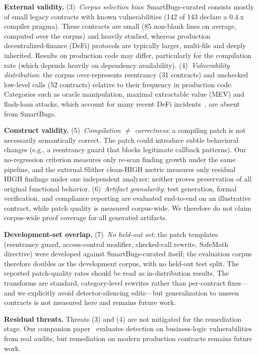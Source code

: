 \documentclass[conference]{IEEEtran}
\begin{document}
\textbf{External validity.} (3)~\emph{Corpus selection bias}: SmartBugs-curated consists mostly of small legacy contracts with known vulnerabilities (142 of 143 declare a 0.4.x compiler pragma). These contracts are small (85 non-blank lines on average, computed over the corpus) and heavily studied, whereas production decentralized-finance (DeFi) protocols are typically larger, multi-file and deeply inherited. Results on production code may differ, particularly for the compilation rate (which depends heavily on dependency availability). (4)~\emph{Vulnerability distribution}: the corpus over-represents reentrancy (31 contracts) and unchecked low-level calls (52 contracts) relative to their frequency in production code. Categories such as oracle manipulation, maximal extractable value (MEV) and flash-loan attacks, which account for many recent DeFi incidents~\cite{zhou2023sok}, are absent from SmartBugs.

\textbf{Construct validity.} (5)~\emph{Compilation $\neq$ correctness}: a compiling patch is not necessarily semantically correct. The patch could introduce subtle behavioral changes (e.g., a reentrancy guard that blocks legitimate callback patterns). Our no-regression criterion measures only re-scan finding growth under the same pipeline, and the external Slither clean-HIGH metric measures only residual HIGH findings under one independent analyzer; neither proves preservation of all original functional behavior. (6)~\emph{Artifact granularity}: test generation, formal verification, and compliance reporting are evaluated end-to-end on an illustrative contract, while patch quality is measured corpus-wide. We therefore do not claim corpus-wide proof coverage for all generated artifacts.

\textbf{Development-set overlap.} (7)~\emph{No held-out set}: the patch templates (reentrancy guard, access-control modifier, checked-call rewrite, SafeMath directive) were developed against SmartBugs-curated itself; the evaluation corpus therefore doubles as the development corpus, with no held-out test split. The reported patch-quality rates should be read as in-distribution results. The transforms are standard, category-level rewrites rather than per-contract fixes---and we explicitly avoid detector-silencing edits---but generalization to unseen contracts is not measured here and remains future work.

\textbf{Residual threats.} Threats (3) and (4) are not mitigated for the remediation stage. Our companion paper~\cite{boiero2025miesc} evaluates detection on business-logic vulnerabilities from real audits, but remediation on modern production contracts remains future work.
\end{document}
